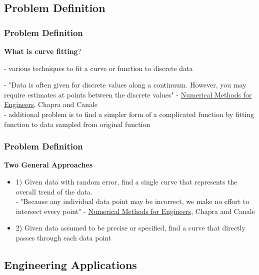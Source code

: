 \documentclass[fleqn]{beamer} %
\newcommand{\sectionIsubsectionItitle}{Problem Definition}
\newcommand{\sectionIsubsectionIItitle}{Engineering Applications}
\begin{document}
		\subsection{\sectionIsubsectionItitle}\label{sectionIsubsectionI}

			\begin{frame}
				\frametitle{\sectionIsubsectionItitle}
				\bigskip
  
        \textbf{What is curve fitting}?
        
        - various techniques to fit a curve or function to discrete data \vspace{5mm}
 
        - "Data is often given for discrete values along a continuum. However, you may require
estimates at points between the discrete values" - \underline{ Numerical Methods for Engineers}, Chapra and Canale \vspace{5mm}\\ 			
        - additional problem is to find a simpler form of a complicated function by fitting function to data sampled from original function
	
				\btVFill
			\end{frame}

			\begin{frame}
				\frametitle{\sectionIsubsectionItitle}
				\bigskip

        \textbf{Two General Approaches}
        \begin{itemize}
          \item 1) Given data with random error, find a single curve that represents the overall trend of the data. \vspace{2mm}\\ 
          -  "Because any individual data point may be incorrect, we make no effort to intersect every point" - \underline{ Numerical Methods for Engineers}, Chapra and Canale \vspc 
        \item 2) Given data assumed to be precise or specified, find a curve that directly passes through each data point \vspace{5mm}\\ 
			  \end{itemize}	
				\btVFill
			\end{frame}


		\subsection{\sectionIsubsectionIItitle}\label{sectionIsubsectionII}
\end{document}
